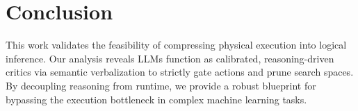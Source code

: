 \section{Conclusion}




This work validates the feasibility of compressing physical execution into logical inference. Our analysis reveals LLMs function as calibrated, reasoning-driven critics via semantic verbalization to strictly gate actions and prune search spaces. By decoupling reasoning from runtime, we provide a robust blueprint for bypassing the execution bottleneck in complex machine learning tasks.